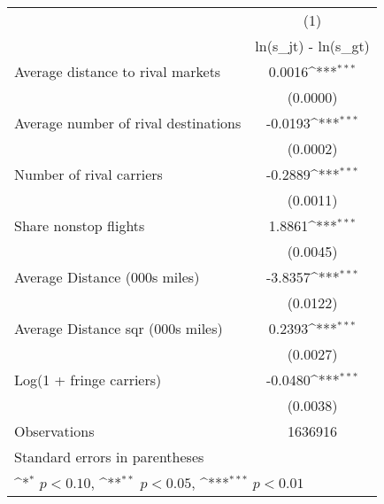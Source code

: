 {
\def\sym#1{\ifmmode^{#1}\else\(^{#1}\)\fi}
\begin{tabular}{l*{1}{c}}
\toprule
                    &\multicolumn{1}{c}{(1)}\\
                    &\multicolumn{1}{c}{ln(s\_jt) - ln(s\_gt)}\\
\midrule
Average distance to rival markets&      0.0016\sym{***}\\
                    &    (0.0000)         \\
\addlinespace
Average number of rival destinations&     -0.0193\sym{***}\\
                    &    (0.0002)         \\
\addlinespace
Number of rival carriers&     -0.2889\sym{***}\\
                    &    (0.0011)         \\
\addlinespace
Share nonstop flights &      1.8861\sym{***}\\
                    &    (0.0045)         \\
\addlinespace
Average Distance (000s miles)&     -3.8357\sym{***}\\
                    &    (0.0122)         \\
\addlinespace
Average Distance sqr (000s miles)&      0.2393\sym{***}\\
                    &    (0.0027)         \\
\addlinespace
Log(1 + fringe carriers)&     -0.0480\sym{***}\\
                    &    (0.0038)         \\
\midrule
Observations        &     1636916         \\
\bottomrule
\multicolumn{2}{l}{\footnotesize Standard errors in parentheses}\\
\multicolumn{2}{l}{\footnotesize \sym{*} \(p<0.10\), \sym{**} \(p<0.05\), \sym{***} \(p<0.01\)}\\
\end{tabular}
}
